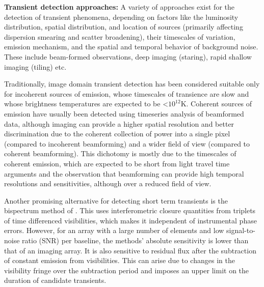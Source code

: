 \documentclass[referee]{aa}
\begin{document}
\begin{table}[tbhp]
\end{table}


\textbf{Transient detection  approaches:} A variety of approaches  exist for the
detection  of transient  phenomena,  depending on  factors  like the  luminosity
distribution, spatial distribution, and  location of sources (primarily affecting
dispersion  smearing and  scatter  broadening), their  timescales of  variation,
emission mechanism, and  the spatial and temporal behavior of background
noise.  These  include beam-formed observations, deep  imaging (staring), rapid
shallow imaging (tiling) etc.

Traditionally,  image domain  transient detection  has been  considered suitable
only for incoherent sources of emission, whose timescales of transience are slow
and  whose brightness  temperatures are  expected to  be  <$10^{12}$K.  Coherent
sources  of emission  have usually  been detected  using timeseries  analysis of
beamformed data,  although imaging can  provide a higher spatial  resolution and
better  discrimination due to  the coherent  collection of  power into  a single
pixel (compared to  incoherent beamforming) and a wider  field of view (compared
to coherent  beamforming).  This  dichotomy is mostly  due to the  timescales of
coherent  emission,  which are  expected  to be  short  from  light travel  time
arguments  and  the  observation  that  beamforming can  provide  high  temporal
resolutions and sensitivities, although over a reduced field of view.

Another  promising  alternative  for  detecting  short term  transients  is  the
bispectrum  method  of \citet{law2012all}.   This  uses interferometric  closure
quantities  from  triplets of  time  differenced  visibilities,  which makes  it
independent of  instrumental phase errors.  However,  for an array  with a large
number  of  elements and  low  signal-to-noise  ratio  (SNR) per  baseline,  the
methods' absolute  sensitivity is lower  than that of  an imaging array.   It is
also sensitive to residual flux  after the subtraction of constant emission from
visibilities.  This can  arise due to changes in the  visibility fringe over the
subtraction  period and  imposes an  upper limit  on the  duration  of candidate
transients.
\end{document}
